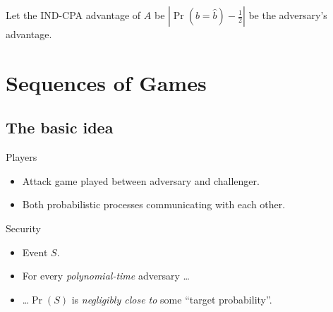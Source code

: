 \begin{frame}
  \begin{example}
    \begin{algorithmic}
        \State{\Return{$\PubKey{}$}}
      \EndFunction{}

      \pause{}

      \Statex{}

      \EndFunction{}

      \pause{}
      \Statex{}

      \EndFunction{}
    \end{algorithmic}

    \pause{}

    Let the IND-CPA advantage of \(A\) be \(|\Pr( b = \hat{b} 
      ) - \frac{1}{2}|\) be the adversary's advantage.
  \end{example}
\end{frame}


\section{Sequences of Games}

\subsection{The basic idea}

\begin{frame}
  \begin{block}{Players}
    \begin{itemize}
      \item Attack game played between adversary and challenger.
      \item Both probabilistic processes communicating with each other.
    \end{itemize}
  \end{block}

  \pause{}

  \begin{block}{Security}
    \begin{itemize}
      \item Event \(S\).
      \item For every \emph{polynomial-time} adversary \dots
      \item \dots \(\Pr(S)\) is \emph{negligibly close to} some \enquote{target 
          probability}.
    \end{itemize}
  \end{block}

\end{frame}

